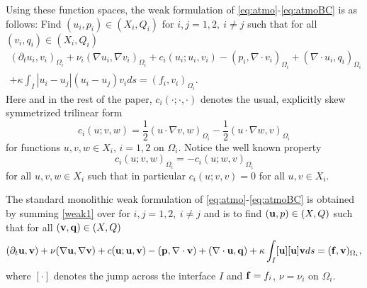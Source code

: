 \documentclass[10pt]{article}%
\numberwithin{equation}{section}
\newcommand{\bff}{{  f}}
\begin{document}
Using these function spaces, the weak formulation of \eqref{eq:atmo}-\eqref{eq:atmoBC} is as follows: Find $(u_i,p_i)\in (X_i,Q_i)$ for $ i,j = 1,2, \ i \neq j$ such that for all $(v_{i},q_i) \in (X_i,Q_i)$
\begin{eqnarray}
(\partial_{t}u_i ,v_{i})_{\Omega_i} +\nu_i(\nabla  {u}_{i},\nabla v_{i})_{\Omega_i}
+ { c_i({u}_{i};{u}_{i},v_{i})}
-(p_i,\nabla\cdot v_i)_{\Omega_i}+(\nabla \cdot u_i,q_i)_{\Omega_i} \nonumber
\\
+\kappa \int_{I}|u_i-u_j |(u_i-u_j)v_{i}ds=(\bff_i,v_{i})_{\Omega_i}. \label{weak1}
\end{eqnarray}
Here and in the rest of the paper, $c_i(\cdot; \cdot,\cdot)$ denotes the usual, explicitly skew symmetrized trilinear form
\begin{equation}
c_i(u;v,w)=\frac{1}{2}(u \cdot \nabla v,w)_{\Omega_i}-\frac{1}{2}(u \cdot \nabla w,v)_{\Omega_i}
\end{equation}
for functions $u,v,w \in X_i$, $i=1,2 $ on $\Omega_i$.  Notice the well known property
$$
c_i(u;v,w)_{\Omega_i}=-c_i(u;w,v)_{\Omega_i}
$$
for all $u,v,w \in X_i$ such that in particular $c_i(u;v,v)=0$ for all $u,v\in X_i$.


The standard monolithic weak formulation of \eqref{eq:atmo}-\eqref{eq:atmoBC} is obtained by summing
\eqref{weak1} over for $ i,j = 1,2, \ i \neq j$ and is to find
$({\bf u},p)\in (X,Q)$  such that for all $({\bf v},{\bf q}) \in (X,Q)$
\begin{eqnarray}
(\partial_{t}{\bf u} ,{\bf v}) +\nu(\nabla  {\bf u},\nabla {\bf v})
+ { c({\bf u};{\bf u},{\bf v})}
-({\bf p},\nabla\cdot {\bf v})+(\nabla \cdot {\bf u},{\bf q})+\kappa \int_{I}[{\bf u}][{\bf u}]{\bf v}ds =({\bf f},{\bf v})_{\Omega_i}, \label{weak2}
\end{eqnarray}
where $[\cdot]$ denotes the jump across the interface $I$ and ${\bf f}=f_i$, $\nu=\nu_i$ on $\Omega_i$.
\end{document}
